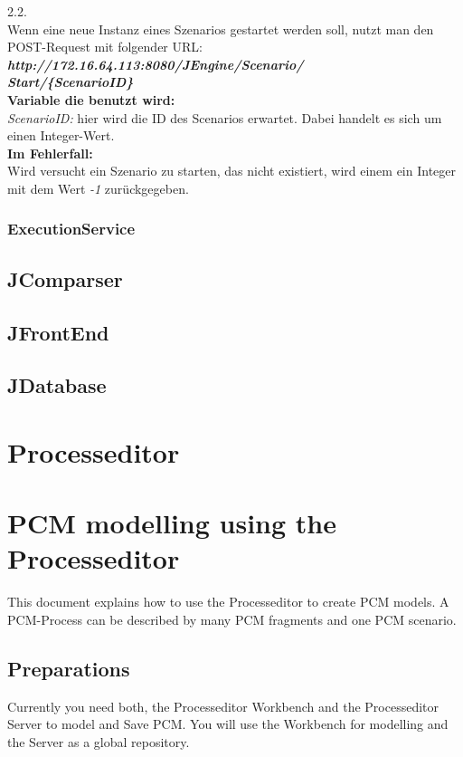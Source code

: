 \documentclass{acm_proc_article-sp}
\begin{document}
\begin{enumerate}
2.2.\\ Wenn eine neue Instanz eines Szenarios gestartet werden soll, nutzt man den POST-Request mit folgender URL:\\
\textit{\textbf{http://172.16.64.113:8080/JEngine/Scenario/\\Start/\{ScenarioID\}}}\\

\textbf{Variable die benutzt wird:}\\
\textit{ScenarioID:} hier wird die ID des Scenarios erwartet. Dabei handelt es sich um einen Integer-Wert.\\

\textbf{Im Fehlerfall:}\\
Wird versucht ein Szenario zu starten, das nicht existiert, wird einem ein Integer mit dem Wert \textit{-1} zurückgegeben.\\
%
%
\end{enumerate}
\subsubsection{ExecutionService}

%
%
\subsection{JComparser}

%
%
\subsection{JFrontEnd}

%
%
\subsection{JDatabase}

%
%
\section{Processeditor}

%
%
\section{PCM modelling using the Processeditor}\label{pcm-modelling-using-the-processeditor}
This document explains how to use the Processeditor to create PCM
models. A PCM-Process can be described by many PCM fragments and one PCM
scenario.

%
%
\subsection{Preparations}\label{preparations}
Currently you need both, the Processeditor Workbench and the
Processeditor Server to model and Save PCM. You will use the Workbench
for modelling and the Server as a global repository.
\end{document}
